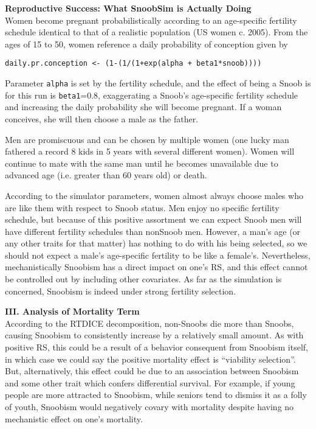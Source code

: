 \documentclass[11pt]{article}
\begin{document}
\newpage
\textbf{Reproductive Success: What SnoobSim is Actually Doing}\\

Women become pregnant probabilistically according to an age-specific fertility schedule identical to that of a realistic population (US women c. 2005).  From the ages of 15 to 50, women reference a daily probability of conception given by

\begin{verbatim}
daily.pr.conception <- (1-(1/(1+exp(alpha + beta1*snoob))))
\end{verbatim}

Parameter \texttt{alpha} is set by the fertility schedule, and the effect of being a Snoob is for this run is \texttt{beta1}=0.8, exaggerating a Snoob's age-specific fertility schedule and increasing the daily probability she will become pregnant.  If a woman conceives, she will then choose a male as the father.  

Men are promiscuous and can be chosen by multiple women (one lucky man fathered a record 8 kids in 5 years with several different women).  Women will continue to mate with the same man until he becomes unavailable due to advanced age (i.e. greater than 60 years old) or death.

According to the simulator parameters, women almost always choose males who are like them with respect to Snoob status.  Men enjoy no specific fertility schedule, but because of this positive assortment we can expect Snoob men will have different fertility schedules than nonSnoob men.  However, a man's age (or any other traits for that matter) has nothing to do with his being selected, so we should not expect a male's age-specific fertility to be like a female's.  Nevertheless, mechanistically Snoobism has a direct impact on one's RS, and this effect cannot be controlled out by including other covariates.  As far as the simulation is concerned, Snoobism is indeed under strong fertility selection.


\newpage
\textbf{III. Analysis of Mortality Term}\\

According to the RTDICE decomposition, non-Snoobs die more than Snoobs, causing Snoobism to consistently increase by a relatively small amount.  As with positive RS, this could be a result of a behavior consequent from Snoobism itself, in which case we could say the positive mortality effect is ``viability selection''.  But, alternatively, this effect could be due to an association between Snoobism and some other trait which confers differential survival.  For example, if young people are more attracted to Snoobism, while seniors tend to dismiss it as a folly of youth, Snoobism would negatively covary with mortality despite having no mechanistic effect on one's mortality.
                            
\end{document}
